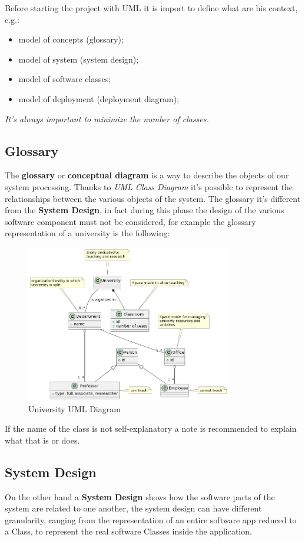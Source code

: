 \documentclass[12pt]{article}
\begin{document}
Before starting the project with UML it is import to define what are his context, e.g.:
\begin{itemize}
  \item model of concepts (glossary);
  \item model of system (system design);
  \item model of software classes;
  \item model of deployment (deployment diagram);
\end{itemize}
\emph{It's always important to minimize the number of classes.}




\subsection{Glossary}
The \textbf{glossary} or \textbf{conceptual diagram} is a way to describe the objects of our system processing. Thanks to \emph{UML Class Diagram} it's possible to represent the relationships between the various objects of the system. The glossary it's different from the \textbf{System Design}, in fact during this phase the design of the various software component must not be considered, for example the glossary representation of a university is the following:
\begin{figure}[H]
  \centering
  \includegraphics[width=0.8\textwidth]{university-uml-diagram.png}
  \caption{University UML Diagram}
  \label{fig:university-uml-diagram}
\end{figure}
If the name of the class is not self-explanatory a note is recommended to explain what that is or does.


\subsection{System Design}
On the other hand a \textbf{System Design} shows how the software parts of the system are related to one another, the system design can have different granularity, ranging from the representation of an entire software app reduced to a Class, to represent the real software Classes inside the application.
\end{document}
